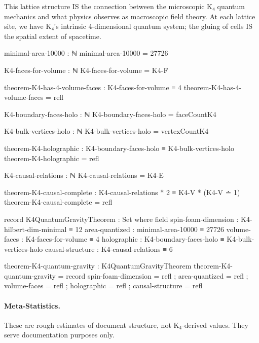 \documentclass[11pt,a4paper]{book}
\begin{document}
This lattice structure IS the connection between the microscopic K₄ quantum mechanics
and what physics observes as macroscopic field theory. At each lattice site, we have K₄'s intrinsic 4-dimensional
quantum system; the gluing of cells IS the spatial extent of spacetime.

\begin{code}
minimal-area-10000 : ℕ
minimal-area-10000 = 27726

K4-faces-for-volume : ℕ
K4-faces-for-volume = K4-F

theorem-K4-has-4-volume-faces : K4-faces-for-volume ≡ 4
theorem-K4-has-4-volume-faces = refl
\end{code}

\begin{code}
K4-boundary-faces-holo : ℕ
K4-boundary-faces-holo = faceCountK4

K4-bulk-vertices-holo : ℕ
K4-bulk-vertices-holo = vertexCountK4

theorem-K4-holographic : K4-boundary-faces-holo ≡ K4-bulk-vertices-holo
theorem-K4-holographic = refl
\end{code}

\begin{code}
K4-causal-relations : ℕ
K4-causal-relations = K4-E

theorem-K4-causal-complete : K4-causal-relations * 2 ≡ K4-V * (K4-V ∸ 1)
theorem-K4-causal-complete = refl
\end{code}

\begin{code}
record K4QuantumGravityTheorem : Set where
  field
    spin-foam-dimension : K4-hilbert-dim-minimal ≡ 12
    area-quantized      : minimal-area-10000 ≡ 27726
    volume-faces        : K4-faces-for-volume ≡ 4
    holographic         : K4-boundary-faces-holo ≡ K4-bulk-vertices-holo
    causal-structure    : K4-causal-relations ≡ 6

theorem-K4-quantum-gravity : K4QuantumGravityTheorem
theorem-K4-quantum-gravity = record
  { spin-foam-dimension = refl
  ; area-quantized      = refl
  ; volume-faces        = refl
  ; holographic         = refl
  ; causal-structure    = refl
  }
\end{code}

\paragraph{Meta-Statistics.}
These are rough estimates of document structure, not K$_4$-derived values. They serve documentation purposes only.
\end{document}
